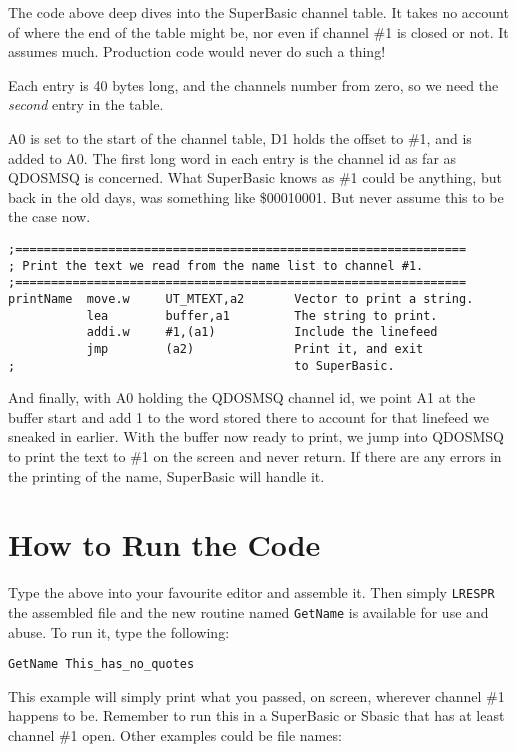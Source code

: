 The code above deep dives into the SuperBasic channel table. It takes no account of where the end of the table might be, nor even if channel \#1 is closed or not. It assumes much. Production code would never do such a thing!

Each entry is 40 bytes long, and the channels number from zero, so we need the \emph{second} entry in the table.

A0 is set to the start of the channel table, D1 holds the offset to \#1, and is added to A0. The first long word in each entry is the channel id as far as QDOSMSQ is concerned. What SuperBasic knows as \#1 could be anything, but back in the old days, was something like \$00010001. But never assume this to be the case now.


\begin{lstlisting}[firstnumber=last,caption={GetName - Printing the Name}]
;===============================================================
; Print the text we read from the name list to channel #1.
;===============================================================
printName  move.w     UT_MTEXT,a2       Vector to print a string.
           lea        buffer,a1         The string to print.
           addi.w     #1,(a1)           Include the linefeed
           jmp        (a2)              Print it, and exit 
;                                       to SuperBasic.
\end{lstlisting}

And finally, with A0 holding the QDOSMSQ channel id, we point A1 at the buffer start and add 1 to the word stored there to account for that linefeed we sneaked in earlier. With the buffer now ready to print, we jump into QDOSMSQ to print the text to \#1 on the screen and never return. If there are any errors in the printing of the name, SuperBasic will handle it.

\section{How to Run the Code}

Type the above into your favourite editor and assemble it. Then simply \texttt{LRESPR} the assembled file and the new routine named \texttt{GetName} is available for use and abuse. To run it, type the following:

\begin{lstlisting}[frame=none,numbers=none]
GetName This_has_no_quotes
\end{lstlisting}

This example will simply print what you passed, on screen, wherever channel \#1 happens to be. Remember to run this in a SuperBasic or Sbasic that has at least channel \#1 open. Other examples could be file names:

